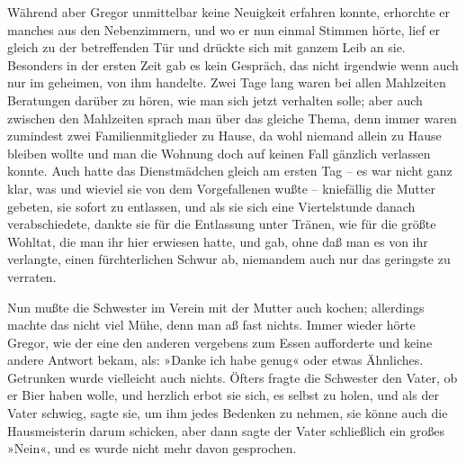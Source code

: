 Während aber Gregor unmittelbar keine Neuigkeit erfahren konnte,
erhorchte er manches aus den Nebenzimmern, und wo er nun einmal Stimmen
hörte, lief er gleich zu der betreffenden Tür und drückte sich mit
ganzem Leib an sie. Besonders in der ersten Zeit gab es kein Gespräch,
das nicht irgendwie wenn auch nur im geheimen, von ihm handelte. Zwei
Tage lang waren bei allen Mahlzeiten Beratungen darüber zu hören, wie
man sich jetzt verhalten solle; aber auch zwischen den Mahlzeiten sprach
man über das gleiche Thema, denn immer waren zumindest zwei
Familienmitglieder zu Hause, da wohl niemand allein zu Hause bleiben
wollte und man die Wohnung doch auf keinen Fall gänzlich verlassen
konnte. Auch hatte das Dienstmädchen gleich am ersten Tag -- es war
nicht ganz klar, was und wieviel sie von dem Vorgefallenen wußte --
kniefällig die Mutter gebeten, sie sofort zu entlassen, und als sie sich
eine Viertelstunde danach verabschiedete, dankte sie für die Entlassung
unter Tränen, wie für die größte Wohltat, die man ihr hier erwiesen
hatte, und gab, ohne daß man es von ihr verlangte, einen fürchterlichen
Schwur ab, niemandem auch nur das geringste zu verraten.

Nun mußte die Schwester im Verein mit der Mutter auch kochen; allerdings
machte das nicht viel Mühe, denn man aß fast nichts. Immer wieder hörte
Gregor, wie der eine den anderen vergebens zum Essen aufforderte und
keine andere Antwort bekam, als: »Danke ich habe genug« oder etwas
Ähnliches. Getrunken wurde vielleicht auch nichts. Öfters fragte die
Schwester den Vater, ob er Bier haben wolle, und herzlich erbot sie
sich, es selbst zu holen, und als der Vater schwieg, sagte sie, um ihm
jedes Bedenken zu nehmen, sie könne auch die Hausmeisterin darum
schicken, aber dann sagte der Vater schließlich ein großes »Nein«, und
es wurde nicht mehr davon gesprochen.

